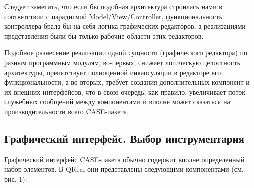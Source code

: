 \documentclass[a5paper]{article}
\begin{document}
Следует заметить, что если бы подобная архитектура строилась нами в
соответствии с парадигмой Model/View/Controller,
функциональность контроллера брала бы на себя логика графических
редакторов, а реализациями представления были бы только рабочие области
этих редакторов.

Подобное разнесение реализации одной сущности (графического редактора)
по разным программным модулям, во-первых, снижает логическую
целостность архитектуры, препятствует полноценной инкапсуляции в
редакторе его функциональности, а во-вторых, требует создания
дополнительных компонент и их внешних интерфейсов, что в свою очередь,
как правило, увеличивает поток служебных сообщений между компонентами и
вполне может сказаться на производительности всего
CASE-пакета.

\subsection{Графический интерфейс. Выбор инструментария}

Графический интерфейс CASE-пакета обычно
содержит вполне определенный набор элементов. В
QReal они представлены следующими
компонентами (см. рис. 1):
\end{document}

